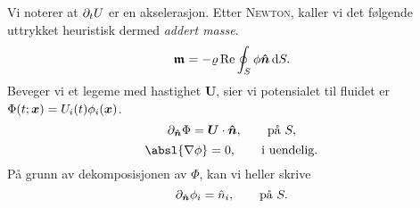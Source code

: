 Vi noterer at $\partial_t U$ er en akselerasjon.
Etter \textsc{Newton}, kaller vi det følgende uttrykket heuristisk dermed \emph{addert masse}.
\[
\bm{\mathfrak{m}} = -\varrho \operatorname{Re}\oint_S \phi \bm{\hat{n}} \,\mathrm{d} S.
\]
Beveger vi et legeme med hastighet $\bm{U}$, sier vi potensialet til fluidet er $\Phi(t;\bm{x}) = U_i(t) \phi_i(\bm{x})$.
\[
        \partial_{\bm{\hat{n}}}\Phi = \bm{U}\cdot\bm{\hat{n}}, \qquad \text{på } S,
\]
\[
        \absl{\nabla \phi} = 0, \qquad \text{i uendelig}.
\]
På grunn av dekomposisjonen av $\Phi$, kan vi heller skrive
\[
        \partial_{\bm{\hat{n}}}\phi_i = {\hat{n}}_{i}, \qquad \text{på } S.
\]
